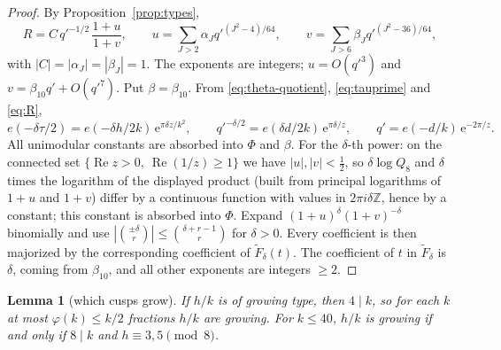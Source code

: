 \documentclass[11pt]{amsart}
\newtheorem{lemma}[theorem]{Lemma}
\theoremstyle{remark}
\theoremstyle{definition}
\newcommand{\Z}{\mathbb Z}
\newcommand{\Rea}{\operatorname{Re}}
\newcommand{\e}{\mathrm e}
\begin{document}
\begin{proof}
By Proposition~\ref{prop:types},
\[
R=C\,q'^{-1/2}\,\frac{1+u}{1+v},\qquad u=\sum_{J>2}\alpha_Jq'^{(J^2-4)/64},\qquad v=\sum_{J>6}\beta_Jq'^{(J^2-36)/64},
\]
with $|C|=|\alpha_J|=|\beta_J|=1$. The exponents are integers; $u=O(q'^3)$ and $v=\beta_{10}q'+O(q'^7)$. Put $\beta=\beta_{10}$. From \eqref{eq:theta-quotient}, \eqref{eq:tauprime} and \eqref{eq:R},
\[
e(-\delta\tau/2)=e(-\delta h/2k)\,\e^{\pi\delta z/k^2},\qquad q'^{-\delta/2}=e(\delta d/2k)\,\e^{\pi\delta/z},\qquad q'=e(-d/k)\,\e^{-2\pi/z}.
\]
All unimodular constants are absorbed into $\Phi$ and $\beta$. For the $\delta$-th power: on the connected set $\{\Rea z>0,\ \Rea(1/z)\ge1\}$ we have $|u|,|v|<\frac12$, so $\delta\log Q_8$ and $\delta$ times the logarithm of the displayed product (built from principal logarithms of $1+u$ and $1+v$) differ by a continuous function with values in $2\pi i\delta\Z$, hence by a constant; this constant is absorbed into $\Phi$. Expand $(1+u)^\delta(1+v)^{-\delta}$ binomially and use $|\binom{\pm\delta}{r}|\le\binom{\delta+r-1}{r}$ for $\delta>0$. Every coefficient is then majorized by the corresponding coefficient of $\widetilde F_\delta(t)$. The coefficient of $t$ in $\widetilde F_\delta$ is $\delta$, coming from $\beta_{10}$, and all other exponents are integers $\ge2$.
\end{proof}

\begin{lemma}[which cusps grow]\label{lem:which}
If $h/k$ is of growing type, then $4\mid k$, so for each $k$ at most $\varphi(k)\le k/2$ fractions $h/k$ are growing. For $k\le40$, $h/k$ is growing if and only if $8\mid k$ and $h\equiv3,5\pmod8$.
\end{lemma}
\end{document}
